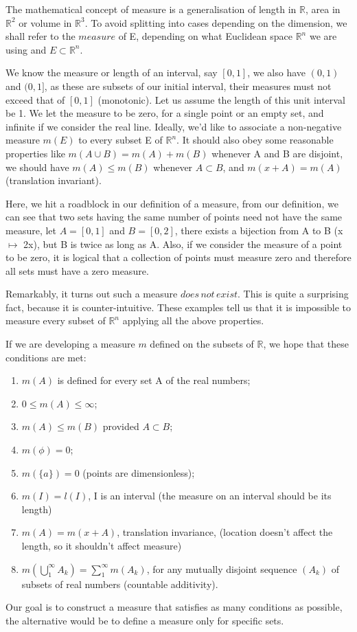 \documentclass{article}
\begin{document}
The mathematical concept of measure is a generalisation of length in $\mathbb{R}$, area in $\mathbb{R}^2$ or volume in $\mathbb{R}^3$. To avoid splitting into cases depending on the dimension, we shall refer to the $measure$ of E, depending on what Euclidean space $\mathbb{R}^n$ we are using and $E \subset \mathbb{R}^n$.\medskip

We know the measure or length of an interval, say $[0,1]$, we also have $(0,1)$ and $(0,1]$, as these are subsets of our initial interval, their measures must not exceed that of $[0,1]$ (monotonic). Let us assume the length of this unit interval be 1. We let the measure to be zero, for a single point or an empty set, and infinite if we consider the real line. Ideally, we'd like to associate a non-negative measure $m(E)$ to every subset E of $\mathbb{R}^n$. It should also obey some reasonable properties like $m(A \cup B) = m(A) + m(B)$ whenever A and B are disjoint, we should have $m(A) \leq m(B)$ whenever $A \subset B$, and $m(x+A)=m(A)$ (translation invariant).\medskip

Here, we hit a roadblock in our definition of a measure, from our definition, we can see that two sets having the same number of points need not have the same measure, let $A=[0,1]$ and $B=[0,2]$, there exists a bijection from A to B (x $\mapsto$ 2x), but B is twice as long as A. Also, if we consider the measure of a point to be zero, it is logical that a collection of points must measure zero and therefore all sets must have a zero measure.\medskip
 
 Remarkably, it turns out such a measure $does \, not \,exist$. This is quite a surprising fact, because it is counter-intuitive. These examples tell us that it is impossible to measure every subset of $\mathbb{R}^n$ applying all the above properties.\medskip
 
 If we are developing a measure $m$ defined on the subsets of $\mathbb{R}$, we hope that these conditions are met:
 \begin{enumerate}
     \item $m(A)$ is defined for every set A of the real numbers;
     \item $0\leq m(A) \leq \infty$;
     \item $m(A) \leq m(B)$ provided $A \subset B$;
     \item $m(\phi) =0 $;
     \item $m(\{a\})=0$ (points are dimensionless);
     \item $m(I)=l(I)$, I is an interval (the measure on an interval should be its length)
     \item $m(A)=m(x+A)$, translation invariance, (location doesn't affect the length, so it shouldn't affect measure)
     \item $m(\bigcup_{1}^{\infty} {A_k}) = \sum_{1}^{\infty}m(A_k)$, for any mutually disjoint sequence $(A_k)$ of subsets of real numbers (countable additivity).
 \end{enumerate}
 Our goal is to construct a measure that satisfies as many conditions as possible, the alternative would be to define a measure only for specific sets.
 
\end{document}
